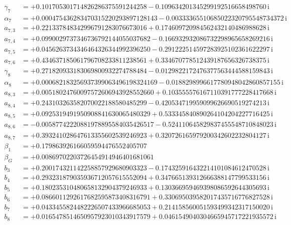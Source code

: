 {\begin{align*}
\gamma_{7} &= +0.101705301714826286375591244258 - 0.109634201345299192516658498760\,\mathrm{i}\\
\alpha_{7} &= +0.000475436283470315220293897128143 - 0.00333365510685022320795548734372\,\mathrm{i}\\
a_{7,3} &= +0.221337848342996791283076673016 + 0.174609720984562432140486988628\,\mathrm{i}\\
a_{7,4} &= +0.0990029737346736792144055037682 - 0.166932932086732298965658269216\,\mathrm{i}\\
a_{7,5} &= +0.0456263734346464326344992396250 - 0.291222514597283925102361622297\,\mathrm{i}\\
a_{7,6} &= +0.434637185061796708233811238561 + 0.334670778512439187656326738375\,\mathrm{i}\\
\gamma_{8} &= +0.271820933183069800932274788484 - 0.0129822172476377563444588159843\,\mathrm{i}\\
\alpha_{8} &= +0.000682183256937399063496198324169 - 0.0188298996617780948042860857155\,\mathrm{i}\\
a_{8,3} &= +0.00518024760097572606943928552660 + 0.103555576167110391777228417668\,\mathrm{i}\\
a_{8,4} &= +0.243103263582070022188580485299 - 0.420534719959099626690519274213\,\mathrm{i}\\
a_{8,5} &= +0.0925319491950908841630065480329 + 0.533345840890264104204227716425\,\mathrm{i}\\
a_{8,6} &= -0.00587742220881978895584035426517 - 0.524110645829837455548710848023\,\mathrm{i}\\
a_{8,7} &= +0.393241028647613355602539246923 + 0.320726165979200342602232804127\,\mathrm{i}\\[1mm]
\beta_1 &= +0.179863926166059594476552405707\\
\beta_G &= +0.00869702203726454914946401681061\\
b_{3} &= +0.200174321142258857929680903323 - 0.174325916432214101084612470528\,\mathrm{i}\\
b_{4} &= +0.293231879035936712057615552094 + 0.347665139312666388147799533156\,\mathrm{i}\\
b_{5} &= +0.180235310480658132904379246933 + 0.130366959469398086592644305693\,\mathrm{i}\\
b_{6} &= +0.0866011292617682595873408316791 + 0.330695039582017435716776827528\,\mathrm{i}\\
b_{7} &= +0.0433455824482226507433966685053 + 0.214158560051593499342317150020\,\mathrm{i}\\
b_{8} &= +0.0165478514650957923010343917579 + 0.0461549040304665945717221935572\,\mathrm{i}
\end{align*}
}

